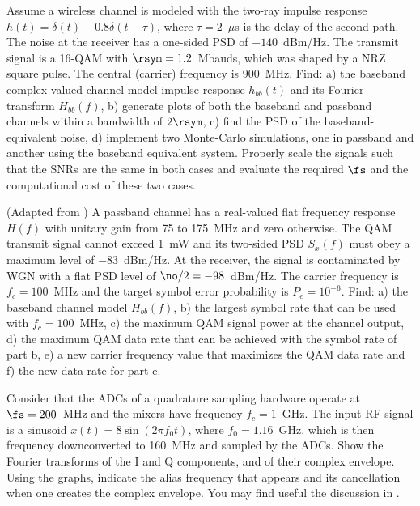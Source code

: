 \begin{exercises}
\item Assume a wireless channel is modeled with the two-ray impulse response
$h(t) = \delta(t) - 0.8 \delta(t-\tau)$, where $\tau = 2$~$\mu$s is the delay of the second path.
The noise at the receiver has a one-sided PSD of $-140$~dBm/Hz. The transmit signal is a 16-QAM with
$\rsym=1.2$~Mbauds, which was shaped by a NRZ square pulse. The central (carrier) frequency is 900~MHz. Find: a) the baseband complex-valued channel model impulse response $h_{bb}(t)$ and its Fourier
transform $H_{bb}(f)$, b) generate plots of both the baseband and passband channels within a bandwidth of $2 \rsym$, c) find the PSD of the baseband-equivalent noise, d) implement two Monte-Carlo
simulations, one in passband and another using the baseband equivalent system. Properly scale the signals such that the SNRs are the same in both cases and evaluate the required $\fs$ and the computational cost of these two cases.


\item (Adapted from \cite{Ciofficn})
A passband channel has a real-valued flat frequency response $H(f)$ with unitary gain from 75 to 175~MHz and zero otherwise. The QAM transmit signal cannot exceed 1~mW and its two-sided PSD $S_x(f)$ must obey a maximum level of $-83$~dBm/Hz. At the receiver, the signal is contaminated by WGN with 
a flat PSD level of $\no/2=-98$~dBm/Hz. The carrier frequency is $f_c=100$~MHz and the target
symbol error probability is $P_e = 10^{-6}$. Find: a) the baseband channel model $H_{bb}(f)$, 
b) the largest symbol rate that can be used with $f_c=100$~MHz, c) the maximum QAM signal power
at the channel output, d) the maximum QAM data rate that can be achieved with the symbol rate of part b, e) a new carrier frequency value that maximizes the QAM data rate and f) the new data
rate for part e.


\item Consider that the ADCs of a quadrature sampling hardware operate at $\fs=200$~MHz and the mixers have frequency $f_c = 1$~GHz. The input RF signal is a sinusoid $x(t)=8 \sin(2 \pi f_0 t)$, where $f_0=1.16$~GHz, which is then frequency downconverted to 160~MHz and sampled by the ADCs. Show the Fourier transforms of the I and Q components, and of their complex envelope. Using the graphs, indicate the alias frequency that appears and its cancellation when one creates the complex envelope. You may find useful the discussion in .

\end{exercises}

